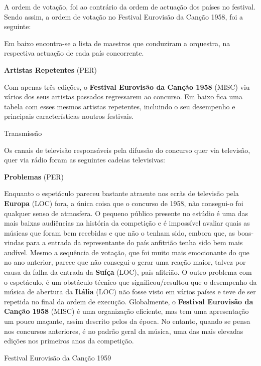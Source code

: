 \documentclass[12pt,a4paper]{article}
\begin{document}
A ordem de votação, foi ao contrário da ordem de actuação dos países no festival. Sendo assim, a ordem de votação no Festival Eurovisão da Canção 1958, foi a seguinte:

Em baixo encontra-se a lista de maestros que conduziram a orquestra, na respectiva actuação de cada país concorrente.



\textbf{Artistas Repetentes} (PER)

Com apenas três edições, o \textbf{Festival Eurovisão da Canção 1958} (MISC) viu vários dos seus artistas passados regressarem ao concurso. Em baixo fica uma tabela com esses mesmos artistas repetentes, incluindo o seu desempenho e principais características noutros festivais.



Transmissão

Os canais de televisão responsáveis pela difussão do concurso quer via televisão, quer via rádio foram as seguintes cadeias televisivas:



\textbf{Problemas} (PER)

Enquanto o espetáculo pareceu bastante atraente nos ecrãs de televisão pela \textbf{Europa} (LOC) fora, a única coisa que o concurso de 1958, não consegui-o foi qualquer senso de atmosfera. O pequeno público presente no estúdio é uma das mais baixas audiências na história da competição e é impossível avaliar quais as músicas que foram bem recebidas e que não o tenham sido, embora que, as boas-vindas para a entrada da representante do país anfitrião tenha sido bem mais audível. Mesmo a sequência de votação, que foi muito mais emocionante do que no ano anterior, parece que não consegui-o gerar uma reação maior, talvez por causa da falha da entrada da \textbf{Suíça} (LOC), país afitrião. O outro problema com o espetáculo, é um obstáculo técnico que significou/resultou que o desempenho da música de abertura da \textbf{Itália} (LOC) não fosse visto em vários países e teve de ser repetida no final da ordem de execução. Globalmente, o \textbf{Festival Eurovisão da Canção 1958} (MISC) é uma organização eficiente, mas tem uma apresentação um pouco maçante, assim descrito pelos da época. No entanto, quando se pensa nos concursos anteriores, é no padrão geral da música, uma das mais elevadas edições nos primeiros anos da competição.



Festival Eurovisão da Canção 1959
\end{document}
